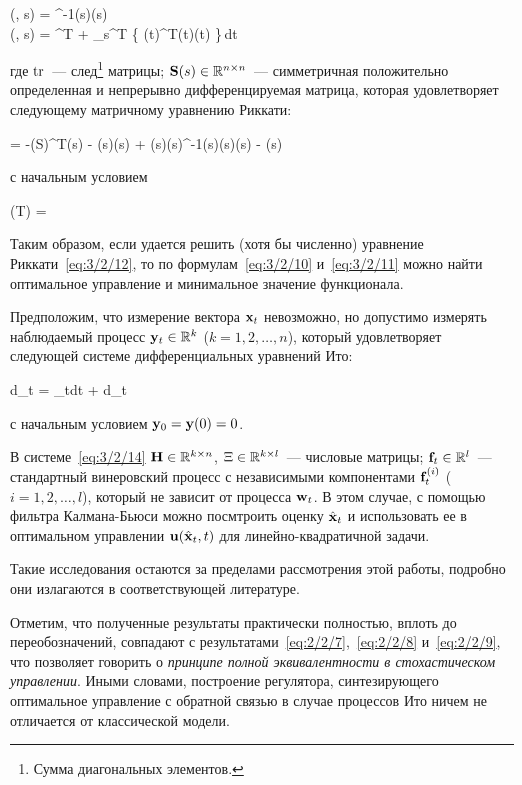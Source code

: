 \beqarr
        (, s) = ^{-1}(s)(s) \text{;} \\
        \funcH(, s) = ^T + \int\limits_s^T \tr \bigl\{ \m{\Sigma}(t)\m{\Sigma}^T(t)(t) \bigr\}\,dt \text{,}
\eeqarr

где $\operatorname{\mathrm{tr}}$~--- след\footnote{ Сумма диагональных элементов. } матрицы; $\mathbf{S}(s) \in \mathbb{R}^{{n} \times {n}}$~--- симметричная положительно определенная и непрерывно дифференцируемая матрица, которая удовлетворяет следующему матричному уравнению Риккати:

     = -(S)^T(s) - (s)(s) + (s)(s)^{-1}(s)(s)(s) - (s)
\eeq

с начальным условием

    (T) =  
\eeq

Таким образом, если удается решить (хотя бы численно) уравнение Риккати~\ref{eq:3/2/12}, то по формулам~\ref{eq:3/2/10} и~\ref{eq:3/2/11} можно найти оптимальное управление и минимальное значение функционала.

\br

Предположим, что измерение вектора $\mathbf{x}_t$ невозможно, но допустимо измерять наблюдаемый процесс $\mathbf{y}_t \in \mathbb{R}^{k}$ ($k = 1, 2, \ldots, n$), который удовлетворяет следующей системе дифференциальных уравнений Ито:

    d_t = _tdt + \Xi d_t
\eeq

с начальным условием $\mathbf{y}_0 = \mathbf{y}(0) = 0$.

В системе~\ref{eq:3/2/14} $\mathbf{H} \in \mathbb{R}^{{k} \times {n}}$, $\Xi \in \mathbb{R}^{{k} \times {l}}$~--- числовые матрицы; $\mathbf{f}_t \in \mathbb{R}^{l}$~--- стандартный винеровский процесс с независимыми компонентами $\mathbf{f}^{(i)}_t$ ($i = 1, 2, \ldots, l$), который не зависит от процесса $\mathbf{w}_t$. В этом случае, с помощью фильтра Калмана-Бьюси можно посмтроить оценку $\hat{\mathbf{x}}_t$ и использовать ее в оптимальном управлении $\mathbf{u}(\hat{\mathbf{x}}_t, t)$ для линейно-квадратичной задачи.

Такие исследования остаются за пределами рассмотрения этой работы, подробно они излагаются в соответствующей литературе\cite{KLOEDEN}.

\br

Отметим, что полученные результаты практически полностью, вплоть до переобозначений, совпадают с результатами~\ref{eq:2/2/7},~\ref{eq:2/2/8} и~\vref{eq:2/2/9}, что позволяет говорить о \emph{принципе полной эквивалентности в стохастическом управлении}. Иными словами, построение регулятора, синтезирующего оптимальное управление с обратной связью в случае процессов Ито ничем не отличается от классической модели.



